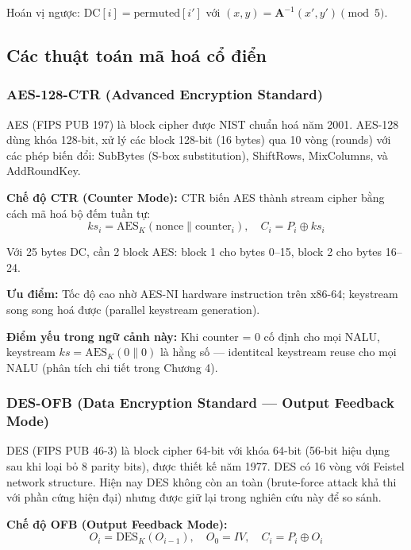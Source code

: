 Hoán vị ngược: $\text{DC}[i] = \text{permuted}[i']$ với $(x, y) = \mathbf{A}^{-1}(x', y') \pmod{5}$.

\subsection{Các thuật toán mã hoá cổ điển}

\subsubsection{AES-128-CTR (Advanced Encryption Standard)}

AES \cite{fips_aes} (FIPS PUB 197) là block cipher được NIST chuẩn hoá năm 2001.
AES-128 dùng khóa 128-bit, xử lý các block 128-bit (16 bytes) qua 10 vòng
(rounds) với các phép biến đổi: SubBytes (S-box substitution), ShiftRows, MixColumns,
và AddRoundKey.

\textbf{Chế độ CTR (Counter Mode):}
CTR biến AES thành stream cipher bằng cách mã hoá bộ đếm tuần tự:
\begin{equation}
ks_i = \text{AES}_K(\text{nonce} \| \text{counter}_i), \quad C_i = P_i \oplus ks_i
\end{equation}

Với 25 bytes DC, cần 2 block AES: block 1 cho bytes 0--15, block 2 cho bytes 16--24.

\textbf{Ưu điểm:} Tốc độ cao nhờ AES-NI hardware instruction trên x86-64;
keystream song song hoá được (parallel keystream generation).

\textbf{Điểm yếu trong ngữ cảnh này:} Khi counter = 0 cố định cho mọi NALU,
keystream $ks = \text{AES}_K(0 \| 0)$ là hằng số --- identitcal keystream reuse
cho mọi NALU (phân tích chi tiết trong Chương 4).

\subsubsection{DES-OFB (Data Encryption Standard --- Output Feedback Mode)}

DES \cite{fips_des} (FIPS PUB 46-3) là block cipher 64-bit với khóa 64-bit (56-bit
hiệu dụng sau khi loại bỏ 8 parity bits), được thiết kế năm 1977. DES có 16 vòng
với Feistel network structure. Hiện nay DES không còn an toàn (brute-force attack
khả thi với phần cứng hiện đại) nhưng được giữ lại trong nghiên cứu này để so sánh.

\textbf{Chế độ OFB (Output Feedback Mode):}
\begin{equation}
O_i = \text{DES}_K(O_{i-1}), \quad O_0 = IV, \quad C_i = P_i \oplus O_i
\end{equation}

